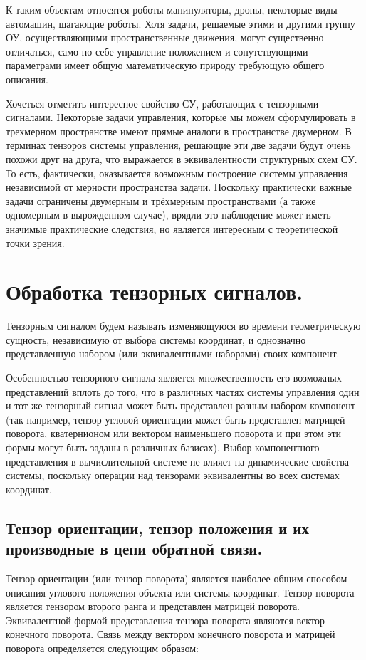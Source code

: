 \documentclass[a4paper]{article}
\begin{document}
К таким объектам относятся роботы-манипуляторы, дроны, некоторые виды автомашин, шагающие роботы. 
Хотя задачи, решаемые этими и другими группу ОУ, осуществляющими пространственные движения, могут существенно отличаться, само по себе управление положением и сопутствующими параметрами имеет общую математическую природу требующую общего описания.

Хочеться отметить интересное свойство СУ, работающих с тензорными сигналами. Некоторые задачи управления, которые мы можем сформулировать в трехмерном пространстве имеют прямые аналоги в пространстве двумерном. В терминах тензоров системы управления, решающие эти две задачи будут очень похожи друг на друга, что выражается в эквивалентности структурных схем СУ. То есть, фактически, оказывается возможным построение системы управления независимой от мерности пространства задачи. Поскольку практически важные задачи ограничены двумерным и трёхмерным пространствами (а также одномерным в вырожденном случае), врядли это наблюдение может иметь значимые практические следствия, но является интересным с теоретической точки зрения. 

\section{Обработка тензорных сигналов.}
Тензорным сигналом будем называть изменяющуюся во времени геометрическую сущность, независимую от выбора системы координат, и однозначно представленную набором (или эквивалентными наборами) своих компонент. 

Особенностью тензорного сигнала является множественность его возможных представлений вплоть до того, что в различных частях системы управления один и тот же тензорный сигнал может быть представлен разным набором компонент (так например, тензор угловой ориентации может быть представлен матрицей поворота, кватернионом или вектором наименьшего поворота и при этом эти формы могут быть заданы в различных базисах). Выбор компонентного представления в вычислительной системе не влияет на динамические свойства системы, поскольку операции над тензорами эквивалентны во всех системах координат.

\subsection{Тензор ориентации, тензор положения и их производные в цепи обратной связи. }
Тензор ориентации (или тензор поворота) является наиболее общим способом описания углового положения объекта или системы координат. Тензор поворота является тензором второго ранга и представлен матрицей поворота. Эквивалентной формой представления тензора поворота являются вектор конечного поворота. Связь между вектором конечного поворота и матрицей поворота определяется следующим образом:
\end{document}
